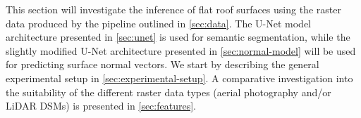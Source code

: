This section will investigate the inference of flat roof surfaces using the raster data produced by the pipeline outlined in \cref{sec:data}.
The U-Net model architecture presented in \cref{sec:unet} is used for semantic segmentation, while the slightly modified U-Net architecture presented in \cref{sec:normal-model} will be used for predicting surface normal vectors.
We start by describing the general experimental setup in \cref{sec:experimental-setup}.
A comparative investigation into the suitability of the different raster data types (aerial photography and/or LiDAR DSMs) is presented in \cref{sec:features}.

